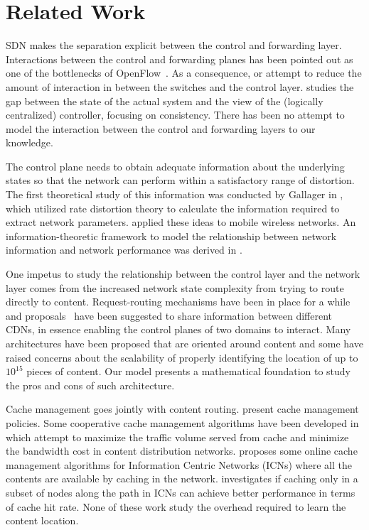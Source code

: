 \documentclass[conference]{IEEEtran}
\theoremstyle{plain}
\theoremstyle{remark}
\begin{document}
\section{Related Work}
\label{sec:related}

SDN makes the separation explicit between the control and forwarding layer. Interactions between the control and forwarding planes has been pointed out as one of the bottlenecks of OpenFlow~\cite{McKeown2008OpenFlow}. As a consequence, \cite{Curtis2011Devo} or \cite{Yu2010Difane} attempt to reduce the amount of interaction in between the switches and the control layer. \cite{Levin2012Logically} studies the gap between the state of the actual system and the view of the (logically centralized) controller, focusing on consistency. There has been no attempt to model the interaction between the control and forwarding layers to our knowledge.

The control plane needs to obtain adequate information about the underlying states so that the network can perform within a satisfactory range of distortion. The first theoretical study of this information was conducted by Gallager in \cite{Gallager1976Basic}, which utilized rate distortion theory to calculate the information required to extract network parameters. \cite{Wang2012Cost} applied these ideas to mobile wireless networks. An information-theoretic framework to model the relationship between network information and network performance was derived in \cite{Hong2009Impact}.

One impetus to study the relationship between the control layer and the network layer comes from the increased network state complexity from trying to route directly to content. Request-routing mechanisms have been in place for a while\cite{Barbir2003Requestrouting} and proposals~\cite{Davie2012Framework} have been suggested to share information between different CDNs, in essence enabling the control planes of two domains to interact. Many architectures have been proposed that are oriented around content\cite{Gritter2001Architecture,Koponen2007Dataoriented,Jacobson2009Networking,Zhang2010Named,Pursuit,Ahlgren2012Survey} and some have raised concerns about the scalability of properly identifying the location of up to $10^{15}$ pieces of content\cite{Ghodsi2011InformationCentric}. Our model presents a mathematical foundation to study the pros and cons of such architecture.

Cache management goes jointly with content routing. \cite{Tang2008BenefitBased}\cite{Bhattacharjee1998Self}\cite{Cho2012WAVE} present cache management policies. Some cooperative cache management algorithms have been developed in \cite{Borst2010Distributed} which attempt to maximize the traffic volume served from cache and minimize the bandwidth cost in content distribution networks. \cite{Sourlas2012Autonomic} proposes some online cache management algorithms for Information Centric Networks (ICNs) where all the contents are available by caching in the network. \cite{Chai2012Cache} investigates if caching only in a subset of nodes along the path in ICNs can achieve better performance in terms of cache hit rate. None of these work study the overhead required to learn the content location. 
\end{document}
